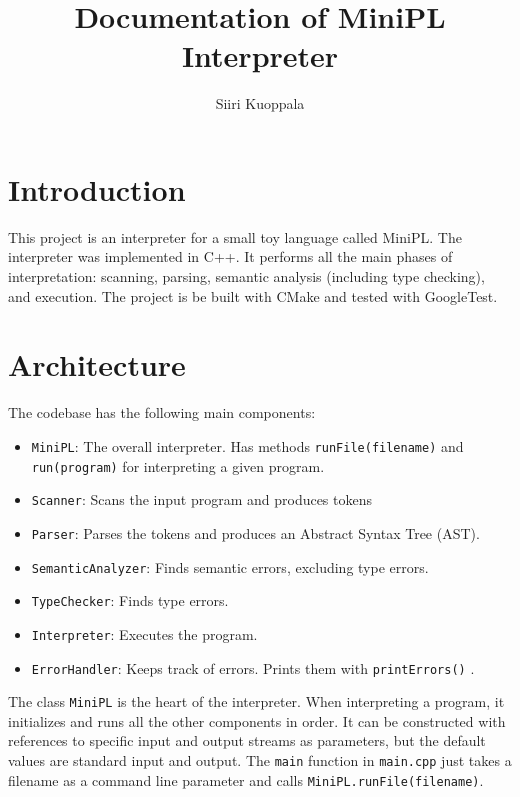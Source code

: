 \documentclass[a4paper]{article}
\newcommand*{\code}[1]{\texttt{#1}}
\begin{document}
\begin{titlepage}
  \title{Documentation of MiniPL Interpreter}
  \author{Siiri Kuoppala}
  \maketitle
  \tableofcontents
\end{titlepage}


\section{Introduction}
This project is an interpreter for a small toy language
called MiniPL. The interpreter was implemented in C++.
It performs all the main phases of interpretation: 
scanning, parsing, semantic analysis (including type checking), 
and execution. The project is be built with CMake and tested 
with GoogleTest. 

\section{Architecture}


The codebase has the following main components:

\begin{itemize}
  \item \code{MiniPL}: The overall interpreter. Has methods 
        \code{runFile(filename)} and \code{run(program)} for 
        interpreting a given program.
  \item \code{Scanner}:  
        Scans the input program and produces tokens
  \item \code{Parser}:
        Parses the tokens and produces an Abstract Syntax Tree (AST).
  \item \code{SemanticAnalyzer}: Finds semantic
        errors, excluding type errors.
  \item \code{TypeChecker}: Finds type errors.
  \item \code{Interpreter}: Executes the program.
  \item \code{ErrorHandler}: Keeps track of errors. Prints them with
  \code{printErrors()} .
\end{itemize}
The class \code{MiniPL} is the heart of the interpreter. When 
interpreting a program, it initializes 
and runs all the other components in order. It can be constructed 
with references to specific input and output streams as parameters, 
but the default values are standard input and output. 
The \code{main} function in \code{main.cpp} just takes a 
filename as a command line parameter and calls 
\code{MiniPL.runFile(filename)}. 
\end{document}
